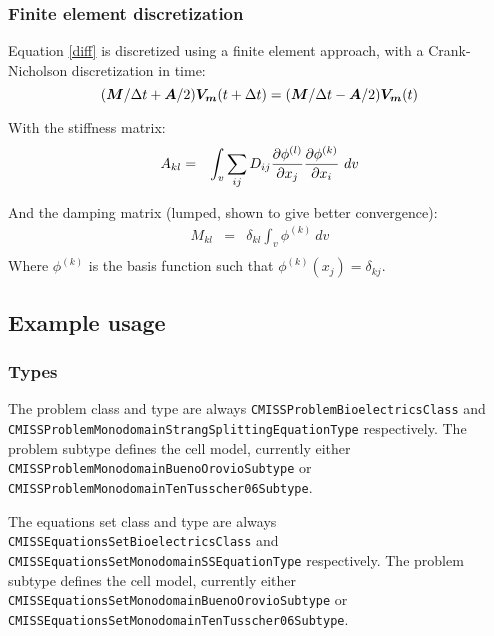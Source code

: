 \subsubsection{Finite element discretization}
Equation \ref{diff} is discretized using a finite element approach, with a Crank-Nicholson discretization in time:\\
\begin{equation}
 (\boldsymbol{M}/\Delta t+\boldsymbol{A}/2) \boldsymbol{V_m}(t+\Delta t) = (\boldsymbol{M}/\Delta t-\boldsymbol{A}/2) \boldsymbol{V_m}(t)
\end{equation}

With the stiffness matrix:
\begin{eqnarray}
A_{kl} &=& \int_v \sum_{ij} D_{ij} \frac{\partial \phi^{(l)}}{\partial x_j} \frac{\partial \phi^{(k)}}{\partial x_i} ~dv
\end{eqnarray}

And the damping matrix (lumped, shown to give better convergence):
\begin{eqnarray}
M_{kl} &=& \delta_{kl}  \int_v \phi^{(k)} ~ dv \\
\end{eqnarray}
Where $\phi^{(k)}$ is the basis function such that $\phi^{(k)}(x_j)=\delta_{kj}$.

\subsection{Example usage}

\subsubsection{Types}
The problem class and type are always \verb!CMISSProblemBioelectricsClass! and \verb!CMISSProblemMonodomainStrangSplittingEquationType! respectively.
The problem subtype defines the cell model, currently either
\verb!CMISSProblemMonodomainBuenoOrovioSubtype! or \verb!CMISSProblemMonodomainTenTusscher06Subtype!.

The equations set class and type are always \verb!CMISSEquationsSetBioelectricsClass! and \verb!CMISSEquationsSetMonodomainSSEquationType! respectively.
The problem subtype defines the cell model, currently either
\verb!CMISSEquationsSetMonodomainBuenoOrovioSubtype! or \verb!CMISSEquationsSetMonodomainTenTusscher06Subtype!.

